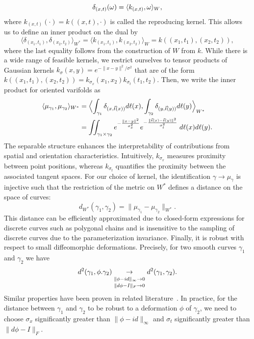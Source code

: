\documentclass[pdflatex,sn-mathphys-num]{sn-jnl}%
\theoremstyle{thmstyleone}%
\theoremstyle{thmstyletwo}%
\theoremstyle{thmstylethree}%
\begin{document}
\begin{equation}
    \delta_{(x,t)}(\omega) = \langle k_{(x,t)}, \omega \rangle_W, 
    \vspace{.3cm}
\end{equation}
where $k_{(x,t)}(\cdot) = k((x,t),\cdot)$ is called the reproducing kernel. This allows us to define an inner product on the dual by 
\begin{equation}
    \langle \delta_{(x_1,t_1)}, \delta_{(x_2,t_2)} \rangle_{W^\ast} = \langle k_{(x_1,t_1)}, k_{(x_2,t_2)}\rangle_W = k((x_1,t_1),(x_2,t_2)) ,
\end{equation}
where the last equality follows from the construction of $W$ from $k$. While there is a wide range of feasible kernels, we restrict ourselves to tensor products of Gaussian kernels $k_\sigma(x,y)=e^{-\|x - y\|^2/\sigma^2}$ that are of the form $k((x_1,t_1), (x_2,t_2))=k_{\sigma_x}(x_1,x_2)k_{\sigma_t}(t_1,t_2)$. Then, we write the inner product for oriented varifolds as  
\begin{align}
\langle \mu_{\gamma_1}, \mu_{\gamma_2}\rangle_{W^\ast} &= \Bigl\langle \int_{\gamma_1} \delta_{(x,\vec{t}(x))} d\ell(x), \int_{\gamma_2} \delta_{(y,\vec{t}(y))} d\ell(y)\Bigr\rangle_{W^\ast} \\
&= \iint_{\gamma_1 \times \gamma_2} e^{-\frac{\|x - y\|^2}{\sigma_x^2}} e^{-\frac{\|\vec{t}(x) - \vec{t}(y)\|^2}{\sigma_t^2}} \;d\ell(x)d\ell(y).
\end{align}
The separable structure enhances the interpretability of contributions from spatial and orientation characteristics. Intuitively, $k_{\sigma_x}$ measures proximity between point positions, whereas $k_{\sigma_t}$ quantifies the proximity between the associated tangent spaces. For our choice of kernel, the identification $\gamma \to \mu_\gamma$ is injective such that the restriction of the metric on $W^\ast$ defines a distance on the space of curves:
\begin{equation}
    d_{W^\ast}(\gamma_1, \gamma_2) = \|\mu_{\gamma_1} - \mu_{\gamma_2}\|_{W^\ast}.
\end{equation}
This distance can be efficiently approximated due to closed-form expressions for discrete curves such as polygonal chains and is insensitive to the sampling of discrete curves due to the parameterization invariance. Finally, it is robust with respect to small diffeomorphic deformations. Precisely, for two smooth curves $\gamma_1$ and $\gamma_2$ we have
\begin{equation} \label{eq:robust}
    d^2(\gamma_1, \phi.\gamma_2) \underset{\substack{\vspace{.05cm} \\ \|\phi - id\|_\infty \to 0 \vspace{.05cm} \\ \|d\phi - I\|_F \to 0}}{\to} d^2(\gamma_1, \gamma_2).
\end{equation}
Similar properties have been proven in related literature~\cite{glaunes_these_2005, charlier_fshape_2017}. In practice, for the distance between $\gamma_1$ and $\gamma_2$ to be robust to a deformation $\phi$ of $\gamma_2$, we need to choose $\sigma_x$ significantly greater than $\|\phi - id\|_\infty$ and $\sigma_t$ significantly greater than $\|d\phi - I\|_F$.
\end{document}

